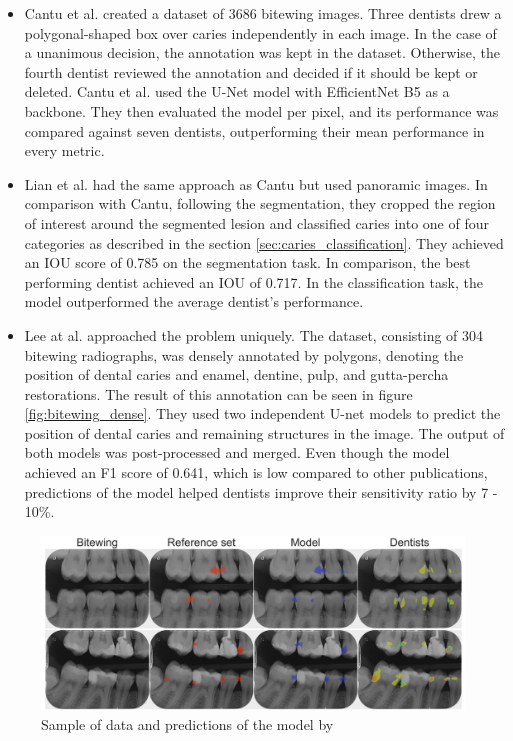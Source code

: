 \begin{itemize}
    \item{Cantu et al. \cite{Cantu2020}} created a dataset of 3686 bitewing images. Three dentists drew a polygonal-shaped box over caries independently in each image. In the case of a unanimous decision, the annotation was kept in the dataset. Otherwise, the fourth dentist reviewed the annotation and decided if it should be kept or deleted. Cantu et al. used the U-Net model with EfficientNet B5 as a backbone. They then evaluated the model per pixel, and its performance was compared against seven dentists, outperforming their mean performance in every metric.
    \item{Lian et al. \cite{Lian2021}} had the same approach as Cantu but used panoramic images. In comparison with Cantu, following the segmentation, they cropped the region of interest around the segmented lesion and classified caries into one of four categories as described in the section \ref{sec:caries_classification}. They achieved an IOU score of 0.785 on the segmentation task. In comparison, the best performing dentist achieved an IOU of 0.717. In the classification task, the model outperformed the average dentist's performance.
    \item {Lee at al. \cite{Lee2021}}  approached the problem uniquely. The dataset, consisting of 304 bitewing radiographs, was densely annotated by polygons, denoting the position of dental caries and enamel, dentine, pulp, and gutta-percha restorations. The result of this annotation can be seen in figure \ref{fig:bitewing_dense}. They used two independent U-net models to predict the position of dental caries and remaining structures in the image. The output of both models was post-processed and merged. Even though the model achieved an F1 score of 0.641, which is low compared to other publications, predictions of the model helped dentists improve their sensitivity ratio by 7 - 10\%.
\end{itemize}

\begin{figure}
    \centering
    \includegraphics[width=\linewidth]{images/segmentatic_literature.png}
    \caption{Sample of data and predictions of the model by }
    \label{fig:segmentation_lit}
\end{figure}

